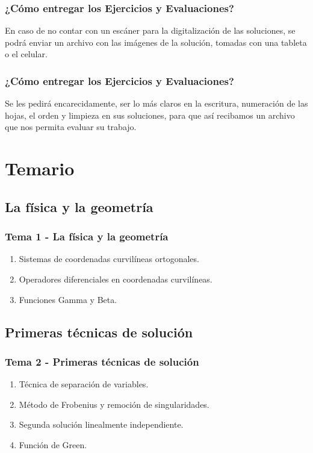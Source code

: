 \documentclass[12pt]{beamer}
\begin{document}
\begin{frame}
\frametitle{¿Cómo entregar los Ejercicios y Evaluaciones?}
En caso de no contar con un escáner para la digitalización de las soluciones, se podrá enviar un archivo con las imágenes de la solución, tomadas con una tableta o el celular.
\end{frame}
\begin{frame}
\frametitle{¿Cómo entregar los Ejercicios y Evaluaciones?}
Se les pedirá encarecidamente, ser lo más claros en la escritura, numeración de las hojas, el orden y limpieza en sus soluciones, para que así recibamos un archivo que nos permita evaluar su trabajo.
\end{frame}

\section{Temario}


\subsection{La física y la geometría}

\begin{frame}
\frametitle{Tema 1 - La física y la geometría}
\begin{enumerate}[<+->]
\item Sistemas de coordenadas curvilíneas ortogonales.
\item Operadores diferenciales en coordenadas curvilíneas.
\item Funciones Gamma y Beta.
\end{enumerate}
\end{frame}

\subsection{Primeras técnicas de solución}

\begin{frame}
\frametitle{Tema 2 - Primeras técnicas de solución}
\begin{enumerate}[<+->]
\item Técnica de separación de variables.
\item Método de Frobenius y remoción de singularidades.
\item Segunda solución linealmente independiente.
\item Función de Green.
\end{enumerate}
\end{frame}
\end{document}
